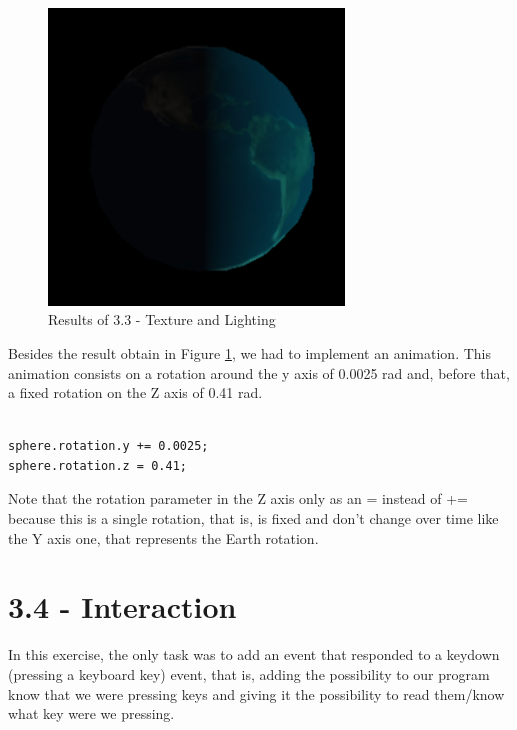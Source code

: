 \documentclass[12pt]{article}
\begin{document}
\begin{figure}[!h]
    \centering
        \includegraphics[width = 0.7\textwidth]{figs/ex_33.png}
        \caption{Results of 3.3 - Texture and Lighting}
        \label{figs:ex_33}
\end{figure}

Besides the result obtain in Figure \ref{figs:ex_33}, we had to implement an animation. This animation consists on a rotation around the y axis of 0.0025 rad and, before that, a fixed rotation on the Z axis of 0.41 rad.
\begin{lstlisting}

sphere.rotation.y += 0.0025;
sphere.rotation.z = 0.41;

\end{lstlisting}

\noindent
Note that the rotation parameter in the Z axis only as an = instead of += because this is a single rotation, that is, is fixed and don't change over time like the Y axis one, that represents the Earth rotation.

\section*{3.4 - Interaction}
\label{ex_34}

In this exercise, the only task was to add an event that responded to a keydown (pressing a keyboard key) event, that is, adding the possibility to our program know that we were pressing keys and giving it the possibility to read them/know what key were we pressing.\par
\end{document}
